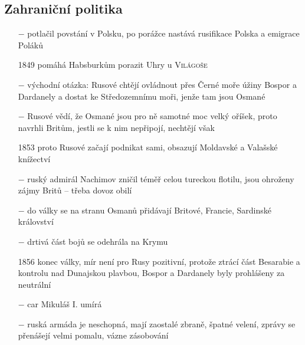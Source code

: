 \documentclass{article}
\begin{document}
\subsection*{Zahraniční politika}
\begin{itemize}
    \vspace{-0.5em}
    \setlength\itemsep{0.15em}
    \item[$-$] potlačil povstání v Polsku, po porážce nastává rusifikace Polska a emigrace Poláků
    \item[1849] pomáhá Habsburkům porazit Uhry u \textsc{Világoše}
    \item[$-$] východní otázka: Rusové chtějí ovládnout přes Černé moře úžiny Bospor a Dardanely a dostat ke Středozemnímu moři, jenže tam jsou Osmané
    \item[$-$] Rusové vědí, že Osmané jsou pro ně samotné moc velký oříšek, proto navrhli Britům, jestli se k nim nepřipojí, nechtějí však
    \item[1853] proto Rusové začají podnikat sami, obsazují Moldavské a Valašské knížectví
    \item[$-$] ruský admirál Nachimov zničil téměř celou tureckou flotilu, jsou ohroženy zájmy Britů -- třeba dovoz obilí
    \item[$-$] do války se na stranu Osmanů přidávají Britové, Francie, Sardinské království
    \item[$-$] drtivá část bojů se odehrála na Krymu
    \item[1856] konec války, mír není pro Rusy pozitivní, protože ztrácí část Besarabie a kontrolu nad Dunajskou plavbou, Bospor a Dardanely byly prohlášeny za neutrální
    \item[$-$] car Mikuláš I. umírá
    \item[$-$] ruská armáda je neschopná, mají zaostalé zbraně, špatné velení, zprávy se přenášejí velmi pomalu, vázne zásobování
\end{itemize}
\end{document}
